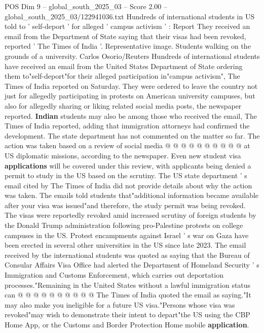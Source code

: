 \begin{textsample}{POS Dim 9 – global\_south\_2025\_03 – Score 2.00 – global\_south\_2025\_03/122941036.txt}  \label{ex:f9_pos_049}
Hundreds of international students in US told to ' self-deport ' for alleged ' campus activism ' : Report They received an email from the Department of State saying that their visas had been revoked, reported ' The Times of India '.
Representative image.
Students walking on the grounds of a university.
Carlos Osorio/Reuters Hundreds of international students have received an email from the United States Department of State ordering them to"self-deport"for their alleged participation in"campus activism", The Times of India reported on Saturday.
They were ordered to leave the country not just for allegedly participating in protests on American university campuses, but also for allegedly sharing or liking related social media posts, the newspaper reported. \textbf{Indian} students may also be among those who received the email, The Times of India reported, adding that immigration attorneys had confirmed the development.
The state department has not commented on the matter so far.
The action was taken based on a review of social media @ @ @ @ @ @ @ @ @ @ at US diplomatic missions, according to the newspaper.
Even new student visa \textbf{applications} will be covered under this review, with applicants being denied a permit to study in the US based on the scrutiny.
The US state department ' s email cited by The Times of India did not provide details about why the action was taken.
The emails told students that"additional information became available after your visa was issued"and therefore, the study permit was being revoked.
The visas were reportedly revoked amid increased scrutiny of foreign students by the Donald Trump administration following pro-Palestine protests on college campuses in the US.
Protest encampments against Israel ' s war on Gaza have been erected in several other universities in the US since late 2023.
The email received by the international students was quoted as saying that the Bureau of Consular Affairs Visa Office had alerted the Department of Homeland Security ' s Immigration and Customs Enforcement, which carries out deportation processes."Remaining in the United States without a lawful immigration status can @ @ @ @ @ @ @ @ @ @ The Times of India quoted the email as saying."It may also make you ineligible for a future US visa."Persons whose visa was revoked"may wish to demonstrate their intent to depart"the US using the CBP Home App, or the Customs and Border Protection Home mobile \textbf{application}.

\end{textsample}
